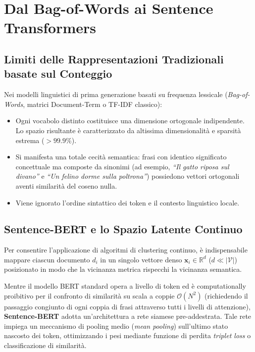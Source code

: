 \FloatBarrier
\section{Dal Bag-of-Words ai Sentence Transformers}
\label{sec:lab-text-embeddings}

\FloatBarrier
\subsection{Limiti delle Rappresentazioni Tradizionali basate sul Conteggio}
\label{subsec:lab-bow-limits}

Nei modelli linguistici di prima generazione basati su frequenza lessicale (\textit{Bag-of-Words}, matrici Document-Term o TF-IDF classico):
\begin{itemize}
    \item Ogni vocabolo distinto costituisce una dimensione ortogonale indipendente. Lo spazio risultante è caratterizzato da altissima dimensionalità e sparsità estrema ($> 99.9\%$).
    \item Si manifesta una totale cecità semantica: frasi con identico significato concettuale ma composte da sinonimi (ad esempio, \textit{``Il gatto riposa sul divano''} e \textit{``Un felino dorme sulla poltrona''}) possiedono vettori ortogonali aventi similarità del coseno nulla.
    \item Viene ignorato l'ordine sintattico dei token e il contesto linguistico locale.
\end{itemize}

\FloatBarrier
\subsection{Sentence-BERT e lo Spazio Latente Continuo}
\label{subsec:lab-sbert}

Per consentire l'applicazione di algoritmi di clustering continuo, è indispensabile mappare ciascun documento $d_i$ in un singolo vettore denso $\mathbf{x}_i \in \mathbb{R}^d$ ($d \ll |\mathcal{V}|$) posizionato in modo che la vicinanza metrica rispecchi la vicinanza semantica. 

Mentre il modello BERT standard opera a livello di token ed è computationally proibitivo per il confronto di similarità su scala a coppie $\mathcal{O}(N^2)$ (richiedendo il passaggio congiunto di ogni coppia di frasi attraverso tutti i livelli di attenzione), \textbf{Sentence-BERT} \cite{reimers2019} adotta un'architettura a rete siamese pre-addestrata. Tale rete impiega un meccanismo di pooling medio (\textit{mean pooling}) sull'ultimo stato nascosto dei token, ottimizzando i pesi mediante funzione di perdita \textit{triplet loss} o classificazione di similarità.

